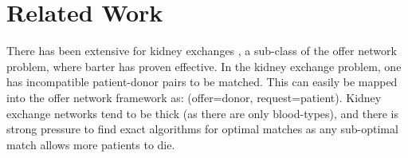 \documentclass[main.tex]{subfiles}
\begin{document}
\section{Related Work}
There has been extensive for kidney exchanges \cite{Bir}\cite{Rot1}\cite{Rot2}\cite{Abr1}, a sub-class of the offer network problem, where barter has proven effective. In the kidney exchange problem, one has incompatible patient-donor pairs to be matched. This can easily be mapped into the offer network framework as: (offer=donor, request=patient). Kidney exchange networks tend to be thick (as there are only blood-types), and there is strong pressure to find exact algorithms for optimal matches as any sub-optimal match allows more patients to die.
\end{document}
